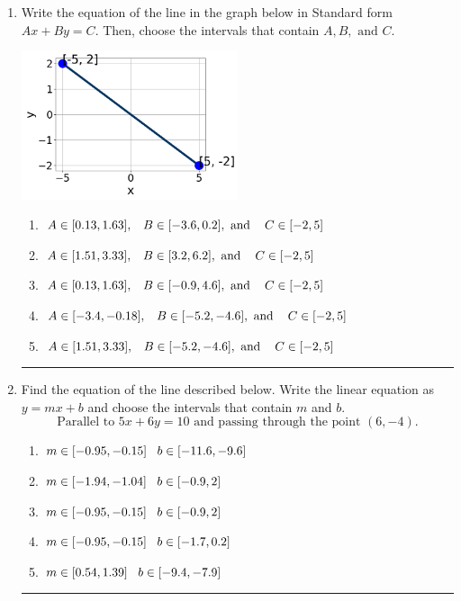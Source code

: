 \documentclass[14pt]{extbook}
\newcommand{\litem}[1]{\item#1\hspace*{-1cm}\rule{\textwidth}{0.4pt}}
\begin{document}
\begin{enumerate}
\litem{
Write the equation of the line in the graph below in Standard form $Ax+By=C$. Then, choose the intervals that contain $A, B, \text{ and } C$.
\begin{center}
    \includegraphics[width=0.5\textwidth]{../Figures/linearGraphToStandardB.png}
\end{center}
\begin{enumerate}[label=\Alph*.]
\item \( A \in [0.13, 1.63], \hspace{3mm} B \in [-3.6, 0.2], \text{ and } \hspace{3mm} C \in [-2, 5] \)
\item \( A \in [1.51, 3.33], \hspace{3mm} B \in [3.2, 6.2], \text{ and } \hspace{3mm} C \in [-2, 5] \)
\item \( A \in [0.13, 1.63], \hspace{3mm} B \in [-0.9, 4.6], \text{ and } \hspace{3mm} C \in [-2, 5] \)
\item \( A \in [-3.4, -0.18], \hspace{3mm} B \in [-5.2, -4.6], \text{ and } \hspace{3mm} C \in [-2, 5] \)
\item \( A \in [1.51, 3.33], \hspace{3mm} B \in [-5.2, -4.6], \text{ and } \hspace{3mm} C \in [-2, 5] \)

\end{enumerate} }
\litem{
Find the equation of the line described below. Write the linear equation as $ y=mx+b $ and choose the intervals that contain $m$ and $b$.\[ \text{Parallel to } 5 x + 6 y = 10 \text{ and passing through the point } (6, -4). \]\begin{enumerate}[label=\Alph*.]
\item \( m \in [-0.95, -0.15] \hspace*{3mm} b \in [-11.6, -9.6] \)
\item \( m \in [-1.94, -1.04] \hspace*{3mm} b \in [-0.9, 2] \)
\item \( m \in [-0.95, -0.15] \hspace*{3mm} b \in [-0.9, 2] \)
\item \( m \in [-0.95, -0.15] \hspace*{3mm} b \in [-1.7, 0.2] \)
\item \( m \in [0.54, 1.39] \hspace*{3mm} b \in [-9.4, -7.9] \)


\end{enumerate}}
\end{enumerate}
\end{document}
